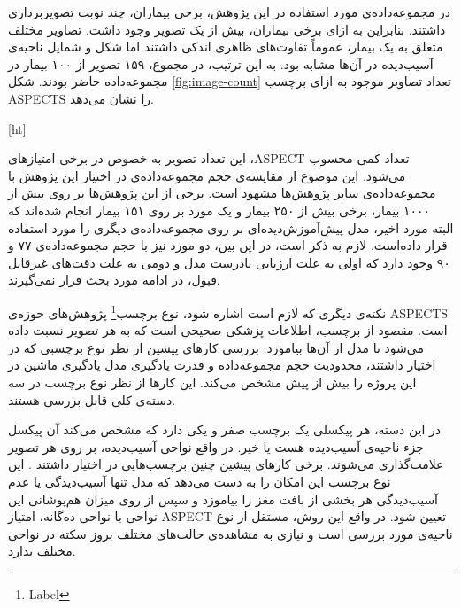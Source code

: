 در مجموعه‌داده‌ی مورد استفاده در این پژوهش، برخی بیماران، چند نوبت تصویربرداری داشتند.
بنابراین به ازای برخی بیماران، بیش از یک تصویر وجود داشت.
تصاویر مختلف متعلق به یک بیمار، عموماً تفاوت‌های ظاهری اندکی داشتند اما شکل و شمایل ناحیه‌ی آسیب‌دیده در آن‌ها مشابه بود.
به این ترتیب، در مجموع، ۱۵۹ تصویر از ۱۰۰ بیمار در مجموعه‌داده حاضر بودند.
شکل \ref{fig:image-count} 
تعداد تصاویر موجود 
به ازای برچسب ASPECTS را نشان می‌دهد.


[ht]

این تعداد تصویر به خصوص در برخی امتیاز‌های ،ASPECT تعداد کمی محسوب می‌شود.
این موضوع از مقایسه‌ی حجم مجموعه‌داده‌ی در اختیار این پژوهش با مجموعه‌داده‌ی 
سایر پژوهش‌ها مشهود است.
برخی از این پژوهش‌ها 
\cite{cao2022deep,upadhyay2023deep,chen2022improving}
بر روی 
بیش از ۱۰۰۰ بیمار، برخی 
\cite{lee2023clinical,chiang2022deep,jung2018evaluating,kuang2019automated,kuang2021eis}
بیش از ۲۵۰ بیمار
و یک مورد 
\cite{naganuma2021alberta}
 بر روی ۱۵۱ بیمار 
انجام شده‌اند که البته مورد اخیر، مدل پیش‌آموزش‌دیده‌ای بر روی مجموعه‌داده‌ی دیگری را مورد استفاده قرار داده‌است.
لازم به ذکر است، در این بین، دو مورد
\cite{golkonda2022automated,yu2021automated}
نیز با حجم مجموعه‌داده‌ی ۷۷ و ۹۰ وجود دارد
که اولی به علت ارزیابی نادرست مدل و دومی به علت دقت‌های غیرقابل قبول، در ادامه مورد بحث قرار نمی‌گیرند.


نکته‌ی دیگری که لازم است اشاره شود، نوع 
برچسب\footnote{Label}
پژوهش‌های 
حوزه‌ی ASPECTS است.
مقصود از برچسب، اطلاعات پزشکی صحیحی است که به هر تصویر نسبت داده می‌شود تا مدل از آن‌ها بیاموزد.
بررسی کار‌های پیشین از نظر نوع برچسبی که در اختیار داشتند، محدودیت حجم مجموعه‌داده و قدرت یادگیری مدل یادگیری ماشین در این پروژه را بیش از پیش مشخص می‌کند.
این کار‌ها از نظر نوع برچسب در سه دسته‌ی کلی قابل بررسی هستند. 

در این دسته،
هر پیکسلی یک برچسب صفر و یکی دارد که مشخص می‌کند آن پیکسل جزء ناحیه‌ی آسیب‌دیده هست یا خیر.
در واقع نواحی آسیب‌دیده، بر روی هر تصویر علامت‌گذاری می‌شوند.
برخی کار‌های پیشین
چنین برچسب‌هایی در اختیار داشتند \cite{cao2022deep,upadhyay2023deep,kuang2021eis,chen2022improving}.
این نوع برچسب این امکان را به دست می‌دهد که مدل تنها آسیب‌دیدگی یا عدم آسیب‌دیدگی هر بخشی از بافت مغز را بیاموزد و سپس از روی میزان هم‌پوشانی این نواحی با نواحی ده‌گانه، امتیاز ASPECT تعیین شود.
در واقع این روش، مستقل از نوع ناحیه‌ی مورد بررسی است و نیازی به مشاهده‌ی حالت‌های مختلف بروز سکته در نواحی مختلف ندارد.

